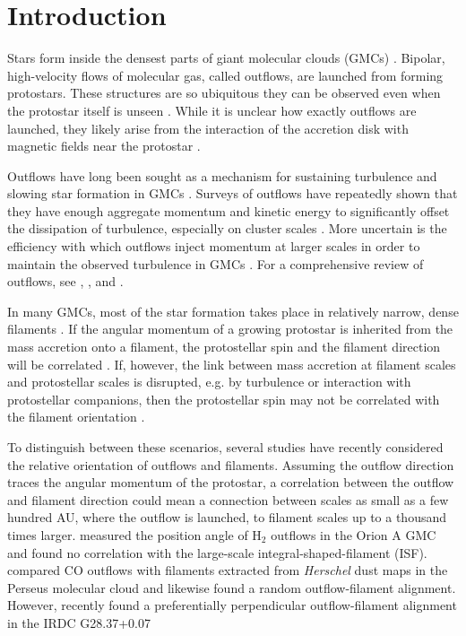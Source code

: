 \documentclass[twocolumn]{aastex63}
\begin{document}
\section{Introduction}
Stars form inside the densest parts of giant molecular clouds (GMCs) \citep{McKee07}. Bipolar, high-velocity flows of molecular gas, called outflows, are launched from forming protostars. These structures are so ubiquitous they can be observed even when the protostar itself is unseen \citep{Kong19}. While it is unclear how exactly outflows are launched, they likely arise from the interaction of the accretion disk with magnetic fields near the protostar \citep[e.g.][]{Konigl00,Shu00,Frank14}.

Outflows have long been sought as a mechanism for sustaining turbulence and slowing star formation in GMCs \citep{Nakamura07,Carroll09,Federrath15}. Surveys of outflows have repeatedly shown that they have enough aggregate momentum and kinetic energy to significantly offset the dissipation of turbulence, especially on cluster scales \citep{Arce10,Nakamura11,Plunkett13,Plunkett15,Li15}. More uncertain is the efficiency with which outflows inject momentum at larger scales in order to maintain the observed turbulence in GMCs \citep{Brunt09,Padoan09,Carroll10}. For a comprehensive review of outflows, see \citet{Arce07}, \citet{Frank14}, and \citet{Bally16}.

In many GMCs, most of the star formation takes place in relatively narrow, dense filaments \citep{Arzoumanian11,Suri19}. If the angular momentum of a growing protostar is inherited from the mass accretion onto a filament, the protostellar spin and the filament direction will be correlated \citep{Bodenheimer95,Andre14,Li19}. If, however, the link between mass accretion at filament scales and protostellar scales is disrupted, e.g. by turbulence or interaction with protostellar companions, then the protostellar spin may not be correlated with the filament orientation \citep{Offner16,Lee17}.


To distinguish between these scenarios, several studies have recently considered the relative orientation of outflows and filaments. Assuming the outflow direction traces the angular momentum of the protostar, a correlation between the outflow and filament direction could mean a connection between scales as small as a few hundred AU, where the outflow is launched, to filament scales up to a thousand times larger. \citet{Davis09} measured the position angle of H$_2$ outflows in the Orion A GMC and found no correlation with the large-scale integral-shaped-filament (ISF). \citet{Stephens17} compared CO outflows with filaments extracted from \emph{Herschel} dust maps in the Perseus molecular cloud and likewise found a random outflow-filament alignment. However, \citet{Kong19} recently found a preferentially perpendicular outflow-filament alignment in the IRDC G28.37+0.07
\end{document}
